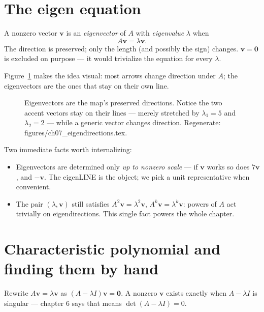 \section{The eigen equation}\label{sec:eig-eq}

\begin{definition}
A nonzero vector $\mathbf v$ is an \emph{eigenvector} of $A$ with
\emph{eigenvalue} $\lambda$ when
\[
A\mathbf v=\lambda\mathbf v .
\]
The direction is preserved; only the length (and possibly the sign)
changes. $\mathbf v=\mathbf0$ is excluded on purpose --- it would trivialize
the equation for every $\lambda$.
\end{definition}

Figure~\ref{fig:eigendirections} makes the idea visual: most arrows change
direction under $A$; the eigenvectors are the ones that stay on their own
line.

\begin{figure}[htbp]
\centering

\caption{Eigenvectors are the map's preserved directions. Notice the two
accent vectors stay on their lines --- merely stretched by $\lambda_1=5$
and $\lambda_2=2$ --- while a generic vector changes direction.
Regenerate: \ttfamily figures/ch07\_eigendirections.tex.}
\label{fig:eigendirections}
\end{figure}

Two immediate facts worth internalizing:

\begin{itemize}
\item Eigenvectors are determined only \emph{up to nonzero scale} --- if
$\mathbf v$ works so does $7\mathbf v$, and $-\mathbf v$. The eigenLINE is
the object; we pick a unit representative when convenient.
\item The pair $(\lambda,\mathbf v)$ still satisfies
$A^2\mathbf v=\lambda^2\mathbf v$, $A^k\mathbf v=\lambda^k\mathbf v$: powers
of $A$ act trivially on eigendirections. This single fact powers the whole
chapter.
\end{itemize}

\section{Characteristic polynomial and finding them by hand}\label{sec:eig-char}

Rewrite $A\mathbf v=\lambda\mathbf v$ as $(A-\lambda I)\mathbf v=\mathbf0$.
A nonzero $\mathbf v$ exists exactly when $A-\lambda I$ is singular ---
chapter 6 says that means $\det(A-\lambda I)=0$.

